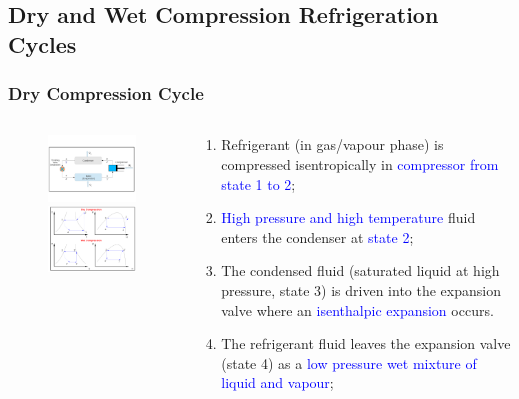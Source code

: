 \documentclass[10pt,compress]{beamer}
\begin{document}
\subsection{Dry and Wet Compression Refrigeration Cycles}

\begin{frame}
 \frametitle{Dry Compression Cycle} 
  \begin{columns}
   \begin{column}[c]{0.5\linewidth}
    \begin{figure}%
     \vbox{
      \includegraphics[width=5.5cm,clip]{./Pics/Overview_Refrig12}
      \vspace{-.5cm}
      \includegraphics[width=4.5cm,clip]{./Pics/Overview_Refrig13}}
    \end{figure}  
   \end{column}  
   \begin{column}[c]{0.5\linewidth}
  \begin{enumerate}[(1)] \scriptsize
   \item <1-> Refrigerant (in gas/vapour phase) is compressed isentropically in \textcolor{blue}{compressor from state 1 to 2}; 
   \item <1-> \textcolor{blue}{High pressure and high temperature} fluid enters the condenser at \textcolor{blue}{state 2};
   \item <1-> The condensed fluid (saturated liquid at high pressure, state 3) is driven into the expansion valve where an \textcolor{blue}{isenthalpic expansion} occurs.
   \item <1-> The refrigerant fluid leaves the expansion valve (state 4) as a \textcolor{blue}{low pressure wet mixture of liquid and vapour};

\end{enumerate}
\end{column}
\end{columns}
\end{frame}
\end{document}
